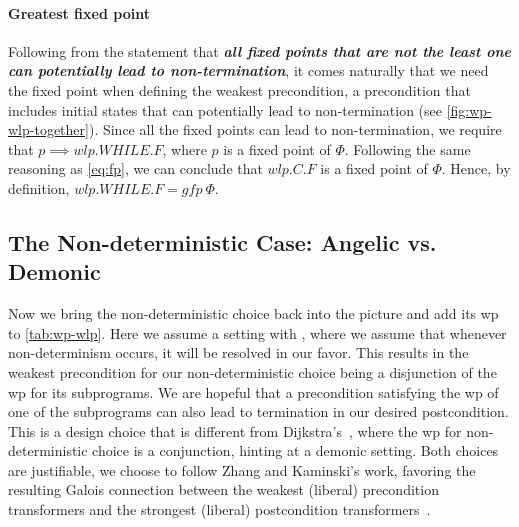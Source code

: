 \paragraph{Greatest fixed point}
Following from the statement that \textbf{\textit{all fixed points that are not the least one can potentially lead to non-termination}}, it comes naturally that we need the  fixed point when defining the weakest  precondition, a precondition that includes  initial states that can potentially lead to non-termination (see \autoref{fig:wp-wlp-together}). 
Since all the fixed points can lead to non-termination, we require that $p \implies wlp.WHILE.F$, where $p$ is a fixed point of $\Phi$.
Following the same reasoning as \autoref{eq:fp}, we can conclude that $wlp.C.F$ is a fixed point of $\Phi$. 
Hence, by definition, $wlp.WHILE.F = gfp\ \Phi$. 


\subsection{The Non-deterministic Case: Angelic vs. Demonic}\label{sec:wp-nondet}
Now we bring the non-deterministic choice back into the picture and add its wp to \autoref{tab:wp-wlp}. 
Here we assume a setting with , where we assume that whenever non-determinism occurs, it will be resolved in our favor.
This results in the weakest precondition for our non-deterministic choice being a disjunction of the wp for its subprograms. 
We are hopeful that a precondition satisfying the wp of one of the subprograms can also lead to termination in our desired postcondition. 
This is a design choice that is different from Dijkstra's~\cite{dijkstra75}, where the wp for non-deterministic choice is a conjunction, hinting at a demonic setting. 
Both choices are justifiable, we choose to follow Zhang and Kaminski's work, favoring the resulting Galois connection between the weakest (liberal) precondition transformers and the strongest (liberal) postcondition transformers~\cite{zhang22}. 


